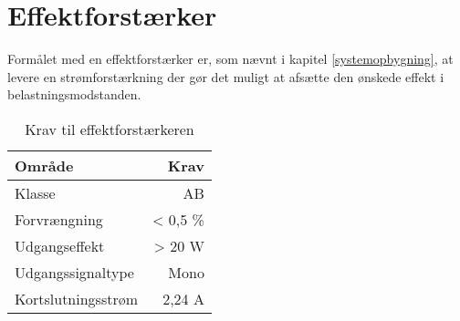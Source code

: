 \chapter{Effektforstærker}
\label{effektforstaerker}
Formålet med en effektforstærker er, som nævnt i kapitel \ref{systemopbygning}, at levere en strømforstærkning der gør det muligt at afsætte den ønskede effekt i belastningsmodstanden. 

\begin{table}[h]
\centering
\begin{tabular}{l|r}
\hline\hline
Område & Krav \\
\hline\hline
Klasse & AB \\[4pt]
Forvrængning & < 0,5 \% \\[4pt]
Udgangseffekt & > 20 W \\[4pt]
Udgangssignaltype & Mono \\[4pt]
Kortslutningsstrøm & 2,24 A \\
\hline\hline
\end{tabular}
\caption{Krav til effektforstærkeren}
\label{tab:krav_effektforstaerker}
\end{table}